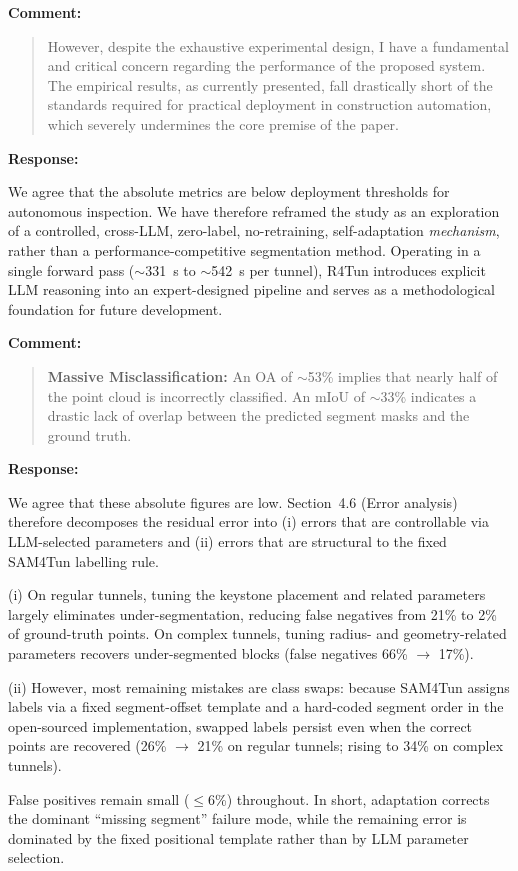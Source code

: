\documentclass[11pt,a4paper]{article}
\newenvironment{commentblock}{%
  \par\smallskip\noindent\textbf{Comment:}\par
  \begin{quote}\itshape\color{black}
}{%
  \end{quote}\smallskip
}
\newenvironment{responseblock}{%
  \par\smallskip\noindent\textbf{Response:}\par
  \begingroup\color{responsegreen}
}{%
  \endgroup\smallskip
}
\begin{document}
\begin{commentblock}
However, despite the exhaustive experimental design, I have a fundamental and critical concern regarding the performance of the proposed system. The empirical results, as currently presented, fall drastically short of the standards required for practical deployment in construction automation, which severely undermines the core premise of the paper.
\end{commentblock}
\begin{responseblock}
We agree that the absolute metrics are below deployment thresholds for autonomous inspection. We have therefore reframed the study as an exploration of a controlled, cross-LLM, zero-label, no-retraining, self-adaptation \emph{mechanism}, rather than a performance-competitive segmentation method. Operating in a single forward pass ($\sim$331~s to $\sim$542~s per tunnel), R4Tun introduces explicit LLM reasoning into an expert-designed pipeline and serves as a methodological foundation for future development.
\end{responseblock}

\begin{commentblock}
\textbf{Massive Misclassification:} An OA of $\sim$53\% implies that nearly half of the point cloud is incorrectly classified. An mIoU of $\sim$33\% indicates a drastic lack of overlap between the predicted segment masks and the ground truth.
\end{commentblock}
\begin{responseblock}
We agree that these absolute figures are low. Section~4.6 (Error analysis) therefore decomposes the residual error into (i) errors that are controllable via LLM-selected parameters and (ii) errors that are structural to the fixed SAM4Tun labelling rule.

(i) On regular tunnels, tuning the keystone placement and related parameters largely eliminates under-segmentation, reducing false negatives from 21\% to 2\% of ground-truth points. On complex tunnels, tuning radius- and geometry-related parameters recovers under-segmented blocks (false negatives 66\% $\rightarrow$ 17\%). 

(ii) However, most remaining mistakes are class swaps: because SAM4Tun assigns labels via a fixed segment-offset template and a hard-coded segment order in the open-sourced implementation, swapped labels persist even when the correct points are recovered (26\% $\rightarrow$ 21\% on regular tunnels; rising to 34\% on complex tunnels). 

False positives remain small ($\leq$6\%) throughout. In short, adaptation corrects the dominant ``missing segment'' failure mode, while the remaining error is dominated by the fixed positional template rather than by LLM parameter selection.
\end{responseblock}
\end{document}
